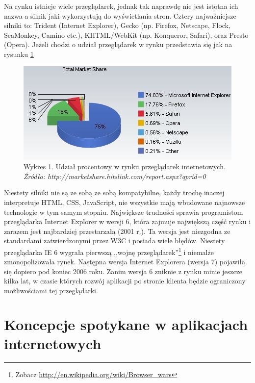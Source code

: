 \documentclass[a4paper,12pt,oneside]{report}
\begin{document}
Na rynku istnieje wiele przeglądarek, jednak tak naprawdę nie jest istotna ich nazwa a silnik jaki wykorzystują do wyświetlania stron. Cztery najważniejsze silniki to: Trident (Internet Explorer), Gecko (np. Firefox, Netscape, Flock, SeaMonkey, Camino etc.), KHTML/WebKit (np. Konqueror, Safari), oraz Presto (Opera). Jeżeli chodzi o udział przeglądarek w rynku przedstawia się jak na rysunku \ref{fig:przegladarki}
\begin{figure}
\begin{center}
  \includegraphics{browsers.png}
  \caption{
  Wykres 1. Udział procentowy w rynku przeglądarek internetowych.\newline
  \emph{Źródło: http://marketshare.hitslink.com/report.aspx?qprid=0}
  \label{fig:przegladarki}
  }
  \end{center}
\end{figure}

Niestety silniki nie są ze sobą ze sobą kompatybilne, każdy trochę inaczej interpretuje HTML, CSS, JavaScript, nie wszystkie mają wbudowane najnowsze technologie w tym samym stopniu. Największe trudności sprawia programistom przeglądarka Internet Explorer w wersji 6, która zajmuje największą część rynku i zarazem jest najbardziej przestarzałą (2001 r.).  Ta wersja jest niezgodna ze standardami zatwierdzonymi przez W3C i posiada wiele błędów. Niestety przeglądarka IE 6 wygrała pierwszą ,,wojnę przeglądarek''\footnote{Zobacz \url{http://en.wikipedia.org/wiki/Browser\_wars}} i niemalże zmonopolizowała rynek. Następna wersja Internet Explorera (wersja 7) pojawiła się dopiero pod koniec 2006 roku. Zanim wersja 6 zniknie z rynku minie jeszcze kilka lat, w czasie których rozwój aplikacji po stronie klienta będzie ograniczony możliwościami tej przeglądarki.

\chapter[Rozwiązania koncepcyjne]{Koncepcje spotykane w aplikacjach internetowych}
\label{cha:koncepcje}
\end{document}
